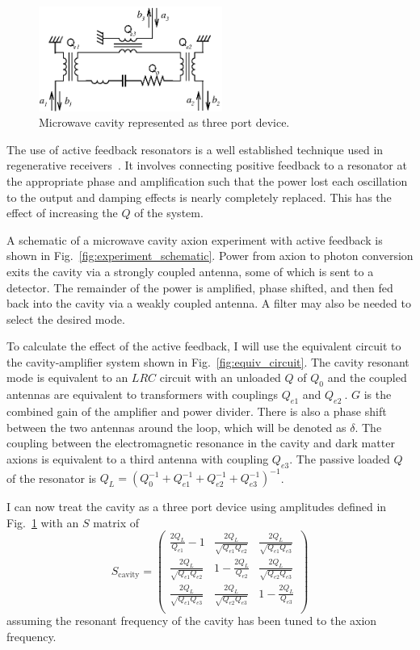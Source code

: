 \documentclass[aps,prl,twocolumn,groupedaddress]{revtex4-1}
\begin{document}
\begin{figure}
\includegraphics[width=6cm]{amplitude_definitions.eps}
\caption{\label{fig:amplitude_defs} Microwave cavity represented as three port device.}
\end{figure}


The use of active feedback resonators is a well established technique used in regenerative receivers~\cite{armstrong1914wireless}.
It involves connecting positive feedback to a resonator at the appropriate phase and amplification such that the power lost each oscillation to the output and damping effects is nearly completely replaced.  
This has the effect of increasing the $Q$ of the system.

A schematic of a microwave cavity axion experiment with active feedback is shown in Fig.~\ref{fig:experiment_schematic}.   Power from axion to photon conversion exits the cavity via a strongly coupled antenna, some of which is sent to a detector.  The remainder of the power is amplified, phase shifted, and then fed back into the cavity via a weakly coupled antenna.  A filter may also be needed to select the desired mode. 

To calculate the effect of the active feedback, I will use the equivalent circuit to the cavity-amplifier system shown in Fig.~\ref{fig:equiv_circuit}.  The cavity resonant mode is equivalent to an $LRC$ circuit with an unloaded $Q$ of $Q_0$ and the coupled antennas are equivalent to transformers with couplings $Q_{e1}$ and $Q_{e2}~$\cite{Montgomery:1948}.  $G$ is the combined gain of the amplifier and power divider.  There is also a phase shift between the two antennas around the loop, which will be denoted as $\delta$.  The coupling between the electromagnetic resonance in the cavity and dark matter axions is equivalent to a third antenna with coupling $Q_{e3}$.  The passive loaded $Q$ of the resonator is $Q_L=\left(Q_0^{-1}+Q_{e1}^{-1}+Q_{e2}^{-1}+Q_{e3}^{-1}\right)^{-1}$.

I can now treat the cavity as a three port device using amplitudes defined in Fig.~\ref{fig:amplitude_defs} with an $S$ matrix of
\begin{equation}
S_{\mathrm{cavity}}=
\left( \begin{array}{ccc}
		\frac{2Q_L}{Q_{e1}}-1 & \frac{2Q_L}{\sqrt{Q_{e1}Q_{e2}}} & \frac{2Q_L}{\sqrt{Q_{e1}Q_{e3}}}  \\
		\frac{2Q_L}{\sqrt{Q_{e1}Q_{e2}}} & 1-\frac{2Q_L}{Q_{e2}} & \frac{2Q_L}{\sqrt{Q_{e2}Q_{e3}}}  \\
		\frac{2Q_L}{\sqrt{Q_{e1}Q_{e3}}} &  \frac{2Q_L}{\sqrt{Q_{e2}Q_{e3}}} &  1-\frac{2Q_L}{Q_{e3}} \\
		\end{array}\right)
\end{equation}
    assuming the resonant frequency of the cavity has been tuned to the axion frequency.
\end{document}
